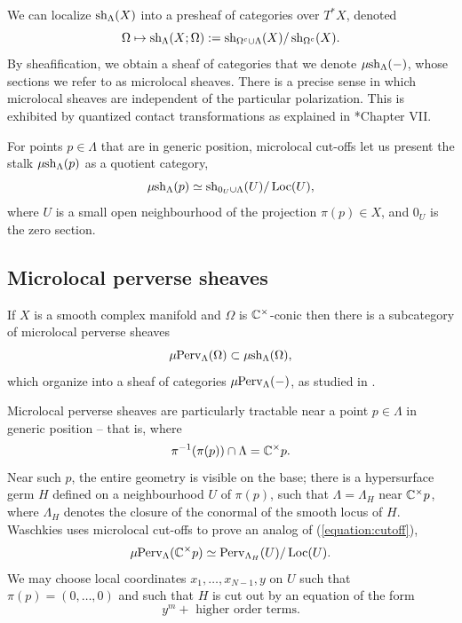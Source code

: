 We can localize $\operatorname{sh}_{\Lambda}(X)$ into a presheaf of categories over $T^*X$, denoted
\[\Omega\mapsto \operatorname{sh}_{\Lambda}(X;\Omega) := \operatorname{sh}_{\Omega^c\cup \Lambda}(X)/\operatorname{sh}_{\Omega^c}(X).\]
By sheafification, we obtain a sheaf of categories that we denote $\mu\kern -2pt \operatorname{sh}_{\Lambda}(-)$, whose sections we refer to as microlocal sheaves. There is a precise sense in which microlocal sheaves are independent of the particular polarization. This is exhibited by quantized contact transformations as explained in \cite{kashiwaraSheavesManifolds1990}*{Chapter VII}.

For points $p\in \Lambda$ that are in generic position, microlocal cut-offs let us present the stalk $\mu\kern -2pt \operatorname{sh}_{\Lambda}(p)$ as a quotient category,
\begin{equation}\label{equation:cutoff}
    \mu\kern -2pt \operatorname{sh}_{\Lambda}(p)\simeq \operatorname{sh}_{0_U\cup \Lambda}(U)/\operatorname{Loc}(U),
\end{equation}
where $U$ is a small open neighbourhood of the projection $\pi(p)\in X$, and $0_U$ is the zero section.

\subsection{Microlocal perverse sheaves}\label{subsection:muperv}
If $X$ is a smooth complex manifold and $\Omega$ is $\mathbb{C}^\times$-conic then there is a subcategory of microlocal perverse sheaves
\[\mu\kern -2pt \operatorname{Perv}_{\Lambda}(\Omega)\subset \mu\kern -2pt \operatorname{sh}_{\Lambda}(\Omega),\]
which organize into a sheaf of categories $\mu\kern -2pt \operatorname{Perv}_{\Lambda}(-)$, as studied in \cites{andronikofMicrolocalVersionRiemannHilbert1994,gelfandMicrolocalPerverseSheaves2005,waschkiesMicrolocalPerverseSheaves2002,waschkiesStackMicrolocalPerverse2004,cotePerverseMicrosheaves2025}.

Microlocal perverse sheaves are particularly tractable near a point $p\in\Lambda$ in generic position -- that is, where
\[\pi^{-1}(\pi(p))\cap \Lambda = \mathbb{C}^\times p.\]
Near such $p$, the entire geometry is visible on the base; there is a hypersurface germ $H$ defined on a neighbourhood $U$ of $\pi(p)$, such that $\Lambda=\Lambda_H$ near $\mathbb{C}^\times p$, where $\Lambda_H$ denotes the closure of the conormal of the smooth locus of $H$. Waschkies \cite{waschkiesStackMicrolocalPerverse2004} uses microlocal cut-offs to prove an analog of (\ref{equation:cutoff}),
\[\mu\kern -2pt \operatorname{Perv}_{\Lambda}(\mathbb{C}^{\times}p)\simeq \operatorname{Perv}_{\Lambda_H}(U)/\operatorname{Loc}(U).\]
We may choose local coordinates $x_1,\dots,x_{N-1},y$ on $U$ such that $\pi(p) = (0,\dots,0)$ and such that $H$ is cut out by an equation of the form
\begin{equation}\label{equation:equation}
    y^m + \text{ higher order terms}.
\end{equation}

